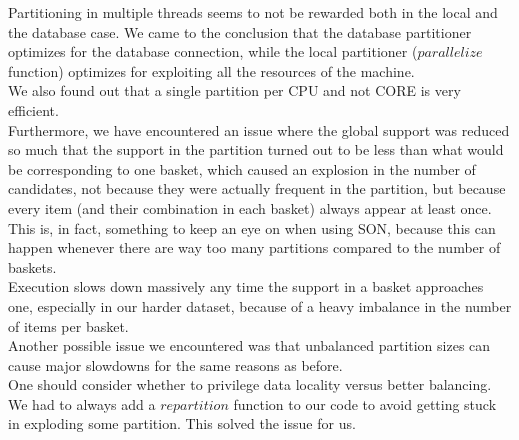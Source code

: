 \documentclass[a4paper]{article}
\begin{document}
	Partitioning in multiple threads seems to not be rewarded both in the local and the database case. We came to the conclusion that the database partitioner optimizes for the database connection, 
	while the local partitioner ($parallelize$ function) optimizes for exploiting all the resources of the machine.\\
	We also found out that a single partition per CPU and not CORE is very efficient.\\
	Furthermore, we have encountered an issue where the global support was reduced so much that the support in the partition
	turned out to be less than what would be corresponding to one basket, which caused an explosion in the number of candidates, not because they were actually frequent
	in the partition, but because every item (and their combination in each basket) always appear at least once.\\
	This is, in fact, something to keep an eye on when using SON, because this can happen whenever there are way too many partitions 
	compared to the number of baskets.\\
	Execution slows down massively any time the support in a basket approaches one, especially in our harder dataset, because
	of a heavy imbalance in the number of items per basket.\\

	Another possible issue we encountered was that unbalanced partition sizes can cause major slowdowns for the same reasons as before.\\
	One should consider whether to privilege data locality versus better balancing.\\
	We had to always add a $repartition$ function to our code to avoid getting stuck in exploding some partition. This solved the issue for us.\\

		
\end{document}

